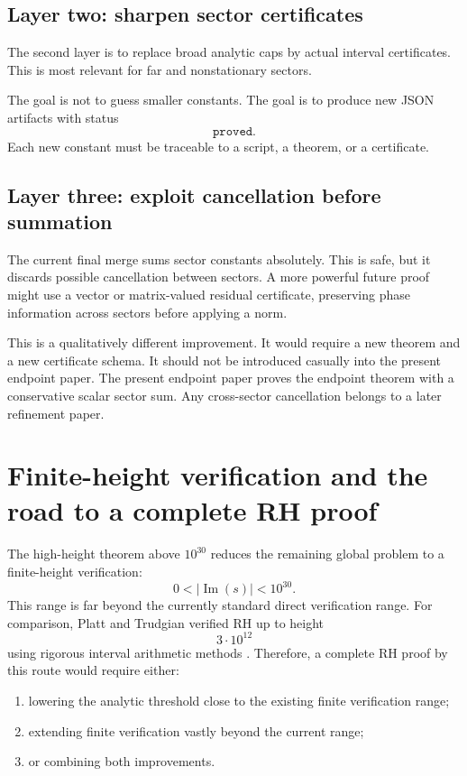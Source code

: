 \documentclass[11pt]{article}
\DeclareMathOperator{\Ima}{Im}
\begin{document}
\subsection{Layer two: sharpen sector certificates}

The second layer is to replace broad analytic caps by actual interval certificates.  This is most relevant for far and nonstationary sectors.

The goal is not to guess smaller constants.  The goal is to produce new JSON artifacts with status
\[
\texttt{proved}.
\]
Each new constant must be traceable to a script, a theorem, or a certificate.

\subsection{Layer three: exploit cancellation before summation}

The current final merge sums sector constants absolutely.  This is safe, but it discards possible cancellation between sectors.  A more powerful future proof might use a vector or matrix-valued residual certificate, preserving phase information across sectors before applying a norm.

This is a qualitatively different improvement.  It would require a new theorem and a new certificate schema.  It should not be introduced casually into the present endpoint paper.  The present endpoint paper proves the endpoint theorem with a conservative scalar sector sum.  Any cross-sector cancellation belongs to a later refinement paper.

\section{Finite-height verification and the road to a complete RH proof}

The high-height theorem above \(10^{30}\) reduces the remaining global problem to a finite-height verification:
\[
0<|\Ima(s)|<10^{30}.
\]
This range is far beyond the currently standard direct verification range.  For comparison, Platt and Trudgian verified RH up to height
\[
3\cdot 10^{12}
\]
using rigorous interval arithmetic methods \cite{platt-trudgian}.  Therefore, a complete RH proof by this route would require either:

\begin{enumerate}[label=\arabic*.]
\item lowering the analytic threshold close to the existing finite verification range;
\item extending finite verification vastly beyond the current range;
\item or combining both improvements.
\end{enumerate}
\end{document}
